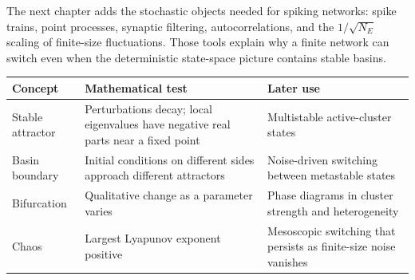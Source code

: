 The next chapter adds the stochastic objects needed for spiking networks: spike trains, point processes, synaptic filtering, autocorrelations, and the $1/\sqrt{N_E}$ scaling of finite-size fluctuations. Those tools explain why a finite network can switch even when the deterministic state-space picture contains stable basins.

\begin{center}
\renewcommand{\arraystretch}{1.35}
\begin{tabular}{p{} p{} p{}}
\hline
\textbf{Concept} & \textbf{Mathematical test} & \textbf{Later use} \\
\hline
Stable attractor & Perturbations decay; local eigenvalues have negative real parts near a fixed point & Multistable active-cluster states \\
Basin boundary & Initial conditions on different sides approach different attractors & Noise-driven switching between metastable states \\
Bifurcation & Qualitative change as a parameter varies & Phase diagrams in cluster strength and heterogeneity \\
Chaos & Largest Lyapunov exponent positive & Mesoscopic switching that persists as finite-size noise vanishes \\
\hline
\end{tabular}
\end{center}
